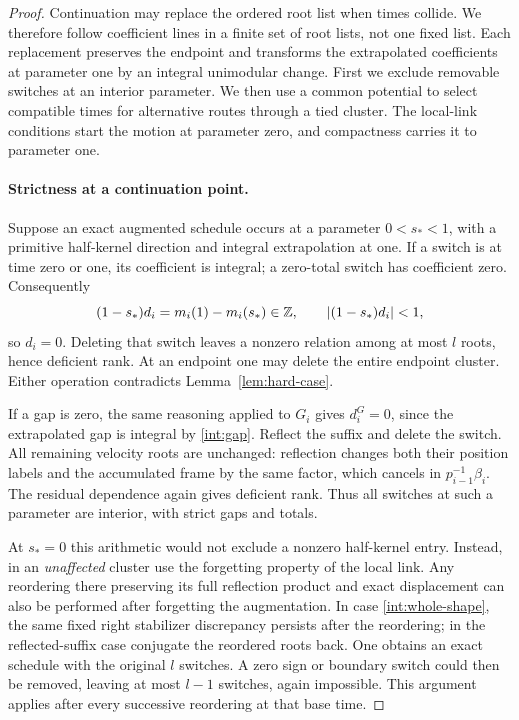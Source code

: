 \begin{proof}
Continuation may replace the ordered root list when times collide.
We therefore follow coefficient lines in a finite set of root lists,
not one fixed list.  Each replacement preserves the endpoint and
transforms the extrapolated coefficients at parameter one by an
integral unimodular change.  First we exclude removable switches at
an interior parameter.  We then use a common potential to select
compatible times for alternative routes through a tied cluster.
The local-link conditions start the motion at parameter zero, and
compactness carries it to parameter one.

\paragraph{Strictness at a continuation point.}
Suppose an exact augmented schedule occurs at a parameter
\(0<s_*<1\), with a primitive half-kernel direction and integral
extrapolation at one.  If a switch is at time zero or one, its
coefficient is integral; a zero-total switch has coefficient zero.
Consequently
\[
 (1-s_*)d_i=m_i(1)-m_i(s_*)\in\mathbb Z,
 \qquad |(1-s_*)d_i|<1,
\]
so \(d_i=0\).  Deleting that switch leaves a nonzero relation among
at most \(l\) roots, hence deficient rank.  At an endpoint one may
delete the entire endpoint cluster.  Either operation contradicts
Lemma~\ref{lem:hard-case}.

If a gap is zero, the same reasoning applied to \(G_i\) gives
\(d_i^G=0\), since the extrapolated gap is integral by
\eqref{int:gap}.  Reflect the suffix and delete the switch.  All
remaining velocity roots are unchanged: reflection changes both their
position labels and the accumulated frame by the same factor, which
cancels in \(p_{i-1}^{-1}\beta_i\).  The residual dependence again gives
deficient rank.  Thus all switches at such a parameter are interior,
with strict gaps and totals.

At \(s_*=0\) this arithmetic would not exclude a nonzero half-kernel
entry.  Instead, in an \emph{unaffected} cluster use the forgetting
property of the local link.  Any reordering there preserving its full
reflection product and exact displacement can also be performed after
forgetting the augmentation.  In case \eqref{int:whole-shape}, the same
fixed right stabilizer discrepancy persists after the reordering; in
the reflected-suffix case conjugate the reordered roots back.
One obtains an exact schedule with the original \(l\) switches.
A zero sign or boundary switch could then be removed, leaving at most
\(l-1\) switches, again impossible.  This argument applies after every
successive reordering at that base time.


\end{proof}
